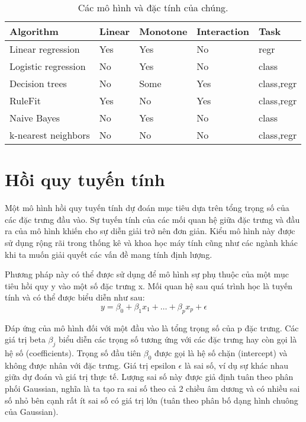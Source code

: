 \begin{table*}[hbt!]
\centering
\label{tab:my-table_z}
\begin{tabular}{|l|l|l|l|l|}
\hline
Algorithm           & Linear & Monotone & Interaction & Task       \\ \hline
Linear regression   & Yes    & Yes      & No          & regr       \\ \hline
Logistic regression & No     & Yes      & No          & class      \\ \hline
Decision trees      & No     & Some     & Yes         & class,regr \\ \hline
RuleFit             & Yes    & No       & Yes         & class,regr \\ \hline
Naive Bayes         & No     & Yes      & No          & class      \\ \hline
k-nearest neighbors & No     & No       & No          & class,regr \\ \hline
\end{tabular}
\caption{Các mô hình và đặc tính của chúng.}
\label{tab:4_1}
\end{table*}

\section{Hồi quy tuyến tính}
Một mô hình hồi quy tuyến tính dự đoán mục tiêu dựa trên tổng trọng số của các đặc trưng đầu vào. Sự tuyến tính của các mối quan hệ giữa đặc trưng và đầu ra của mô hình khiến cho sự diễn giải trở nên đơn giản. Kiểu mô hình này được sử dụng rộng rãi trong thống kê và khoa học máy tính cũng như các ngành khác khi ta muốn giải quyết các vấn đề mang tính định lượng.

Phương pháp này có thể được sử dụng để mô hình sự phụ thuộc của một mục tiêu hồi quy y vào một số đặc trưng x. Mối quan hệ sau quá trình học là tuyến tính và có thể được biểu diễn như sau: $$y=\beta_{0}+\beta_{1}x_{1}+\ldots+\beta_{p}x_{p}+\epsilon$$

Đáp ứng của mô hình đối với một đầu vào là tổng trọng số của p đặc trưng. Các giá trị beta $\beta_{j}$ biểu diễn các trọng số tương ứng với các đặc trưng hay còn gọi là hệ số (coefficients). Trọng số đầu tiên $\beta_0$ được gọi là hệ số chặn (intercept) và không được nhân với đặc trưng. Giá trị epsilon $\epsilon$ là sai số, ví dụ sự khác nhau giữa dự đoán và giá trị thực tế. Lượng sai số này được giả định tuân theo phân phối Gaussian, nghĩa là ta tạo ra sai số theo cả 2 chiều âm dương và có nhiều sai số nhỏ bên cạnh rất ít sai số có giá trị lớn (tuân theo phân bố dạng hình chuông của Gaussian).

